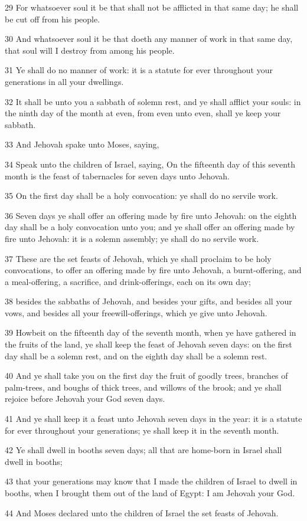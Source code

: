 \par 29 For whatsoever soul it be that shall not be afflicted in that same day; he shall be cut off from his people.
\par 30 And whatsoever soul it be that doeth any manner of work in that same day, that soul will I destroy from among his people.
\par 31 Ye shall do no manner of work: it is a statute for ever throughout your generations in all your dwellings.
\par 32 It shall be unto you a sabbath of solemn rest, and ye shall afflict your souls: in the ninth day of the month at even, from even unto even, shall ye keep your sabbath.
\par 33 And Jehovah spake unto Moses, saying,
\par 34 Speak unto the children of Israel, saying, On the fifteenth day of this seventh month is the feast of tabernacles for seven days unto Jehovah.
\par 35 On the first day shall be a holy convocation: ye shall do no servile work.
\par 36 Seven days ye shall offer an offering made by fire unto Jehovah: on the eighth day shall be a holy convocation unto you; and ye shall offer an offering made by fire unto Jehovah: it is a solemn assembly; ye shall do no servile work.
\par 37 These are the set feasts of Jehovah, which ye shall proclaim to be holy convocations, to offer an offering made by fire unto Jehovah, a burnt-offering, and a meal-offering, a sacrifice, and drink-offerings, each on its own day;
\par 38 besides the sabbaths of Jehovah, and besides your gifts, and besides all your vows, and besides all your freewill-offerings, which ye give unto Jehovah.
\par 39 Howbeit on the fifteenth day of the seventh month, when ye have gathered in the fruits of the land, ye shall keep the feast of Jehovah seven days: on the first day shall be a solemn rest, and on the eighth day shall be a solemn rest.
\par 40 And ye shall take you on the first day the fruit of goodly trees, branches of palm-trees, and boughs of thick trees, and willows of the brook; and ye shall rejoice before Jehovah your God seven days.
\par 41 And ye shall keep it a feast unto Jehovah seven days in the year: it is a statute for ever throughout your generations; ye shall keep it in the seventh month.
\par 42 Ye shall dwell in booths seven days; all that are home-born in Israel shall dwell in booths;
\par 43 that your generations may know that I made the children of Israel to dwell in booths, when I brought them out of the land of Egypt: I am Jehovah your God.
\par 44 And Moses declared unto the children of Israel the set feasts of Jehovah.

